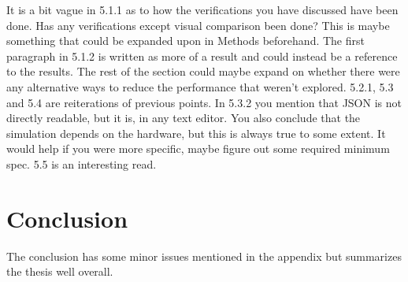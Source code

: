 \documentclass[12pt,a4paper,twoside,openright]{report}
\begin{document}
	It is a bit vague in 5.1.1 as to how the verifications you have discussed
	have been done. Has any verifications except visual comparison been done?
	This is maybe something that could be expanded upon in Methods beforehand.
	The first paragraph in 5.1.2 is written as more of a result and could
	instead be a reference to the results. The rest of the section could maybe
	expand on whether there were any alternative ways to reduce the performance
	that weren't explored.  5.2.1, 5.3 and 5.4 are reiterations of previous
	points.  In 5.3.2 you mention that JSON is not directly readable, but it
	is, in any text editor.  You also conclude that the simulation depends on
	the hardware, but this is always true to some extent. It would help if you
	were more specific, maybe figure out some required minimum spec. 5.5 is an
	interesting read.

\section*{Conclusion}

	The conclusion has some minor issues mentioned in the appendix but
	summarizes the thesis well overall.
\end{document}
